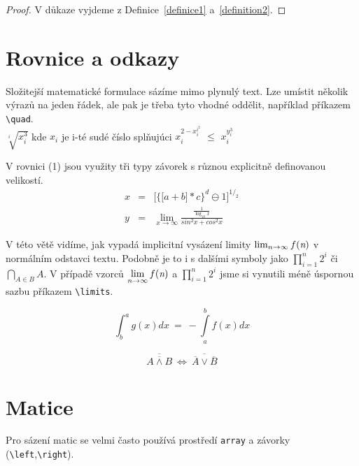 \documentclass[11pt,a4paper,twocolumn]{article}
\theoremstyle{definition}
\begin{document}
        \vspace{-1.0em}
        \begin{proof}
            V důkaze vyjdeme z Definice~\ref{definice1} a~\ref{definition2}.
        \end{proof}


\section{Rovnice a odkazy}
    Složitejší matematické formulace sázíme mimo plynulý text. Lze umístit několik výrazů na jeden řádek, ale pak je třeba tyto vhodné oddělit, například příkazem \verb!\quad!.\\[1.0em]
    $\sqrt[i]{x_i^3}$ kde $x_i$ je i-té sudé číslo splňujúci $x_i^{2-x_i^{i^2}}$ $\leq$ $x_i^{y_i^3}$\par
    \vspace{0.3em}
    V rovnici (1) jsou využity tři typy závorek s různou explicitně definovanou velikostí.
    \begin{eqnarray}
    \label{eq:1}
        x & = & \Bigg[\bigg\{\Big[a+b\Big]\ast c\bigg\}^d \ominus 1\Bigg]^{1/_2}\\
        y & = & \lim\limits_{x \to \infty} \frac{\frac{1}{\log_{10} x}}{sin^2x+cos^2x} \nonumber
    \end{eqnarray}

    V této větě vidíme, jak vypadá implicitní vysázení limity $\lim_{n \to \infty} f{(\emph{n})}$ v normálním odstavci textu. Podobně je to i s dalšími symboly jako $\prod_{i=1}^{n} 2^i$ či $\bigcap_{A\in B}A$. V případě vzorců $\lim\limits_{n \to \infty} f{(\emph{n})}$ a $\displaystyle\prod_{i=1}^{n} 2^i$ jsme si vynutili méně úspornou sazbu příkazem \verb!\limits!.

    \begin{equation}
        \int_{b}^{a} g(x)dx\ =\ - \int\limits_{a}^{b} f(x) dx
    \end{equation}

    \begin{equation}
        \overline{\overline{A\wedge B}} \ \Leftrightarrow \ \overline{\overline{A}\vee \overline{B}}
    \end{equation}
    
\section{Matice}
    Pro sázení matic se velmi často používá prostředí \texttt{array} a závorky (\verb!\left!,\verb!\right!).
\end{document}

